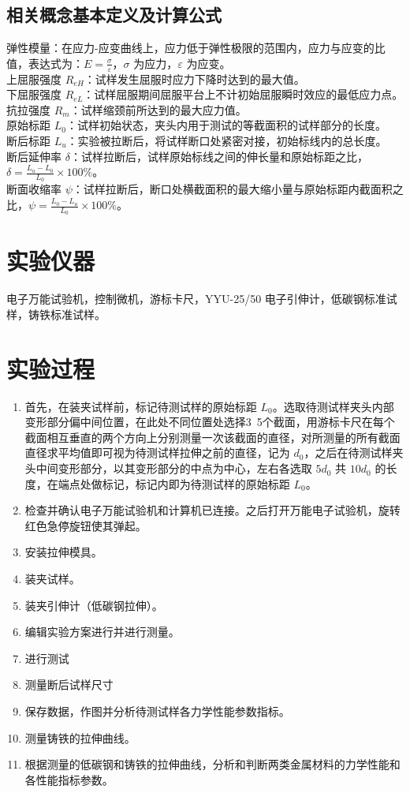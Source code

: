 \documentclass[a4paper,utf8]{article}
\begin{document}
\subsection{相关概念基本定义及计算公式}
\noindent 弹性模量：在应力-应变曲线上，应力低于弹性极限的范围内，应力与应变的比值，表达式为：\linebreak $E =\displaystyle \frac{\sigma}{\varepsilon}$，$\sigma$ 为应力，$\varepsilon$ 为应变。\\
上屈服强度 $R_{eH}$：试样发生屈服时应力下降时达到的最大值。\\
下屈服强度 $R_{eL}$：试样屈服期间屈服平台上不计初始屈服瞬时效应的最低应力点。\\
抗拉强度 $R_m$：试样缩颈前所达到的最大应力值。\\
原始标距 $L_0$：试样初始状态，夹头内用于测试的等截面积的试样部分的长度。\\
断后标距 $L_u$：实验被拉断后，将试样断口处紧密对接，初始标线内的总长度。\\
断后延伸率 $\delta$：试样拉断后，试样原始标线之间的伸长量和原始标距之比，$\delta = \displaystyle\frac{L_u-L_0}{L_0}\times 100\%$。\\
断面收缩率 $\psi$：试样拉断后，断口处横截面积的最大缩小量与原始标距内截面积之比，\linebreak $\psi = \displaystyle\frac{L_0-L_u}{L_0}\times 100\%$。
\section{实验仪器}%
电子万能试验机，控制微机，游标卡尺，YYU-25/50 电子引伸计，低碳钢标准试样，铸铁标准试样。
\section{实验过程}%
\begin{enumerate}
    \item 首先，在装夹试样前，标记待测试样的原始标距 $L_0$。选取待测试样夹头内部变形部分偏中间位置，在此处不同位置处选择3~5个截面，用游标卡尺在每个截面相互垂直的两个方向上分别测量一次该截面的直径，对所测量的所有截面直径求平均值即可视为待测试样拉伸之前的直径，记为 $d_0$，之后在待测试样夹头中间变形部分，以其变形部分的中点为中心，左右各选取 $5d_0$ 共 $10d_0$ 的长度，在端点处做标记，标记内即为待测试样的原始标距 $L_0$。
    \item 检查并确认电子万能试验机和计算机已连接。之后打开万能电子试验机，旋转红色急停旋钮使其弹起。
    \item 安装拉伸模具。
    \item 装夹试样。
    \item 装夹引伸计（低碳钢拉伸）。
    \item 编辑实验方案进行并进行测量。
    \item 进行测试
    \item 测量断后试样尺寸
    \item 保存数据，作图并分析待测试样各力学性能参数指标。
    \item 测量铸铁的拉伸曲线。
    \item 根据测量的低碳钢和铸铁的拉伸曲线，分析和判断两类金属材料的力学性能和各性能指标参数。
\end{enumerate}
\end{document}
